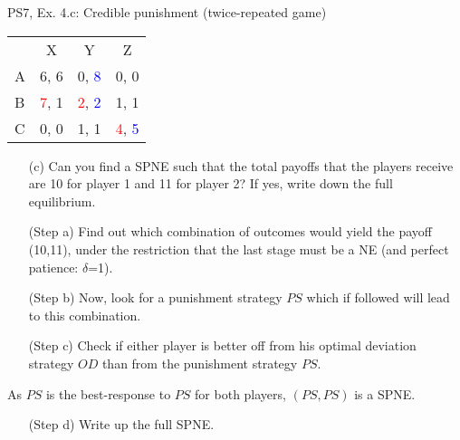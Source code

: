 \begin{frame}{PS7, Ex. 4.c: Credible punishment (twice-repeated game)}
    \vspace{-2pt}
    \begin{table}
      \begin{tabular}{l|c|c|c|}
        \multicolumn{1}{c}{} & \multicolumn{1}{c}{X} & \multicolumn{1}{c}{Y} & \multicolumn{1}{c}{Z}\\\cline{2-4}
        A   & 6, 6 &  0, \textcolor{blue}{8} &  0, 0  \\\cline{2-4}
        B & \textcolor{red}{7}, 1  & \textcolor{red}{2}, \textcolor{blue}{2} &  1, 1  \\\cline{2-4}
        C & 0, 0  & 1, 1 &  \textcolor{red}{4}, \textcolor{blue}{5}  \\\cline{2-4}
      \end{tabular}
    \end{table}
    \vspace{-4pt}
    \begin{itemize}
        \item[(c)] Can you find a SPNE such that the total payoffs that the players receive are 10 for player 1 and 11 for player 2? If yes, write down the full equilibrium.
    \end{itemize}
    \vspace{-8pt}
    \begin{multicols}{2}
      \begin{itemize}
        \item[(Step a)] Find out which combination of outcomes would yield the payoff (10,11), under the restriction that the last stage must be a NE (and perfect patience: $\delta$=1).
        \item[(Step b)] Now, look for a punishment strategy $PS$ which if followed will lead to this combination.
        \item[(Step c)] Check if either player is better off from his optimal deviation strategy $OD$ than from the punishment strategy $PS$.
      \end{itemize}
      \vspace{-6pt}
      As $PS$ is the best-response to $PS$ for both players, $(PS,PS)$ is a SPNE.
      \vspace{-6pt}
      \begin{itemize}
        \item[(Step d)] Write up the full SPNE.
      \end{itemize}
      \vfill\null\columnbreak
      \begin{enumerate}

\end{enumerate}
\end{multicols}
\end{frame}
